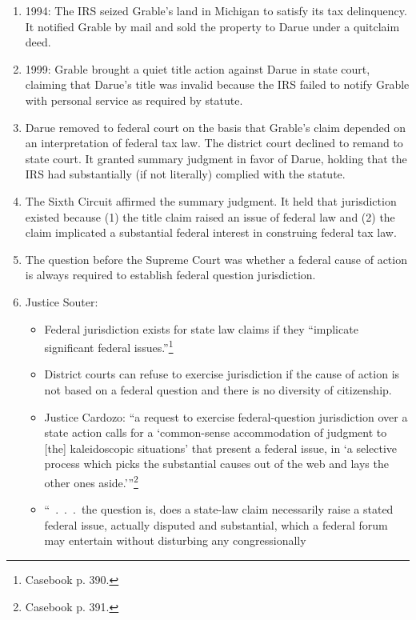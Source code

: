 \begin{enumerate}
    \item 1994: The IRS seized Grable's land in Michigan to satisfy its tax 
    delinquency. It notified Grable by mail and sold the property to Darue 
    under a quitclaim deed.
    \item 1999: Grable brought a quiet title action against Darue in state 
    court, claiming that Darue's title was invalid because the IRS failed to 
    notify Grable with personal service as required by statute.
    \item Darue removed to federal court on the basis that Grable's claim 
    depended on an interpretation of federal tax law. The district court 
    declined to remand to state court. It granted summary judgment in favor of 
    Darue, holding that the IRS had substantially (if not literally) complied 
    with the statute.
    \item The Sixth Circuit affirmed the summary judgment. It held that 
    jurisdiction existed because (1) the title claim raised an issue of 
    federal law and (2) the claim implicated a substantial federal interest in 
    construing federal tax law.
    \item The question before the Supreme Court was whether a federal cause of 
    action is always required to establish federal question jurisdiction.
    \item Justice Souter:
    \begin{itemize}
        \item Federal jurisdiction exists for state law claims if they 
        ``implicate significant federal issues.''\footnote{Casebook p. 390.}
        \item District courts can refuse to exercise jurisdiction if the cause 
        of action is not based on a federal question and there is no diversity 
        of citizenship.
        \item Justice Cardozo: \enquote{a request to exercise federal-question 
        jurisdiction over a state action calls for a \enquote{common-sense 
        accommodation of judgment to [the] kaleidoscopic situations} that 
        present a federal issue, in \enquote{a selective process which picks 
        the substantial causes out of the web and lays the other ones 
        aside.}}\footnote{Casebook p. 391.}
        \item ``~.~.~.~the question is, does a state-law claim necessarily 
        raise a stated federal issue, actually disputed and substantial, which 
        a federal forum may entertain without disturbing any congressionally 

\end{itemize}
\end{enumerate}
